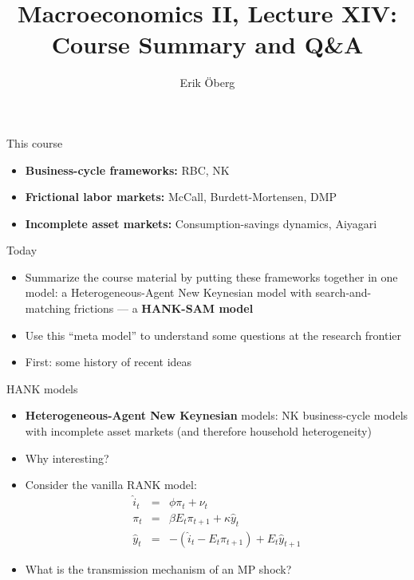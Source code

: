 \documentclass[9pt]{beamer}
\title[Course Summary]{\large Macroeconomics II, Lecture XIV:\\
	Course Summary and Q\&A}
\author{Erik {\"O}berg}
\date{}
\begin{document}
\begin{frame}
\vspace*{-1.5em}
\titlepage
\end{frame}

\begin{frame}{This course}
\begin{itemize}
	\setlength\itemsep{1.5em}
	
	\item \textbf{Business-cycle frameworks:} RBC, NK
	\item \textbf{Frictional labor markets:} McCall, Burdett-Mortensen, DMP
	\item \textbf{Incomplete asset markets:} Consumption-savings dynamics, Aiyagari
\end{itemize}
\end{frame}


\begin{frame}{Today}
\begin{itemize}
	\setlength\itemsep{1.5em}
		
	\item Summarize the course material by putting these frameworks together in one model: a Heterogeneous-Agent New Keynesian model with search-and-matching frictions --- a \bf HANK-SAM \normalfont model
	
	\item Use this ``meta model'' to understand some questions at the research frontier
	
	\item First: some history of recent ideas
\end{itemize}
\end{frame}

\begin{frame}{HANK models}
\begin{itemize}
	\setlength\itemsep{1.5em}
	\item \textbf{Heterogeneous-Agent New Keynesian} models: NK business-cycle
	models with incomplete asset markets (and therefore household heterogeneity)
	\item Why interesting?
	\item Consider the vanilla RANK model:
	\begin{eqnarray*}
		\hat{i}_{t} & = & \phi\pi_{t}+\nu_{t}\\
		\pi_{t} & = & \beta E_{t}\pi_{t+1}+\kappa\hat{y}_{t}\\
		\hat{y}_{t} & = & -(\hat{i}_{t}-E_{t}\pi_{t+1})+E_{t}\hat{y}_{t+1}
	\end{eqnarray*}
	\item What is the transmission mechanism of an MP shock?
\end{itemize}
\end{frame}
\end{document}
